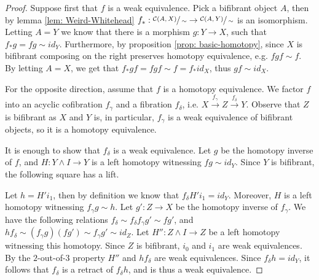 \documentclass[../thesis.tex]{subfiles}
\begin{document}
            \begin{proof}
                Suppose first that $f$ is a weak equivalence. Pick a bifibrant object $A$, then by lemma \ref{lem: Weird-Whitehead} $f_*:\sfrac{\mathcal{C}(A,X)}{\sim}\rightarrow \sfrac{\mathcal{C}(A,Y)}{\sim}$ is an isomorphism. Letting $A = Y$ we know that there is a morphism $g:Y\rightarrow X$, such that $f_*g = fg \sim id_Y$. Furthermore, by proposition \ref{prop: basic-homotopy}, since $X$ is bifibrant composing on the right preserves homotopy equivalence, e.g. $fgf \sim f$. By letting $A = X$, we get that $f_*gf = fgf \sim f = f_*id_X$, thus $gf \sim id_X$.

                For the opposite direction, assume that $f$ is a homotopy equivalence. We factor $f$ into an acyclic cofibration $f_\gamma$ and a fibration $f_\delta$, i.e. $X \overset{f_\gamma}{\rightarrow} Z \overset{f_\delta}{\rightarrow} Y$. Observe that $Z$ is bifibrant as $X$ and $Y$ is, in particular, $f_\gamma$ is a weak equivalence of bifibrant objects, so it is a homotopy equivalence. 

                It is enough to show that $f_\delta$ is a weak equivalence. Let $g$ be the homotopy inverse of $f$, and $H:Y\wedge I \rightarrow Y$ is a left homotopy witnessing $fg \sim id_Y$. Since $Y$ is bifibrant, the following square has a lift.
                \begin{center}
                \end{center}
                Let $h = H'i_1$, then by definition we know that $f_\delta H'i_1 = id_Y$. Moreover, $H$ is a left homotopy witnessing $f_\gamma g \sim h$. Let $g': Z\rightarrow X$ be the homotopy inverse of $f_\gamma$. We have the following relations $f_\delta \sim f_\delta f_\gamma g' \sim fg'$, and $hf_\delta \sim (f_\gamma g)(fg') \sim f_\gamma g' \sim id_Z$. Let $H'':Z\wedge I\rightarrow Z$ be a left homotopy witnessing this homotopy. Since $Z$ is bifibrant, $i_0$ and $i_1$ are weak equivalences. By the $2$-out-of-$3$ property $H''$ and $hf_\delta$ are weak equivalences. Since $f_\delta h = id_Y$, it follows that $f_\delta$ is a retract of $f_\delta h$, and is thus a weak equivalence.
            \end{proof}
\end{document}
